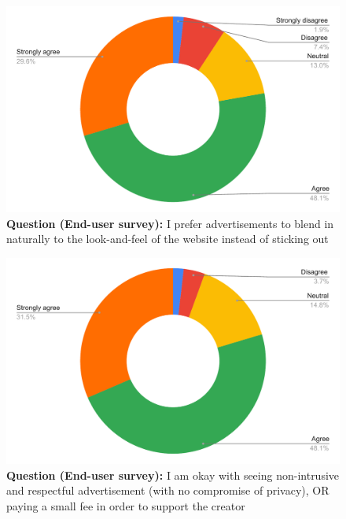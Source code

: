 \begin{figure}[H]
  \centering
  \includegraphics[width=13cm]{thesis/paper/images/p2u_q3.pdf}
  \textbf{Question (End-user survey):} I prefer advertisements to blend in naturally to the look-and-feel of the website instead of sticking out
\end{figure}

\begin{figure}[H]
  \centering
  \includegraphics[width=13cm]{thesis/paper/images/p2u_q4.pdf}
  \textbf{Question (End-user survey):} I am okay with seeing non-intrusive and respectful advertisement (with no compromise of privacy), OR paying a small fee in order to support the creator
\end{figure}

